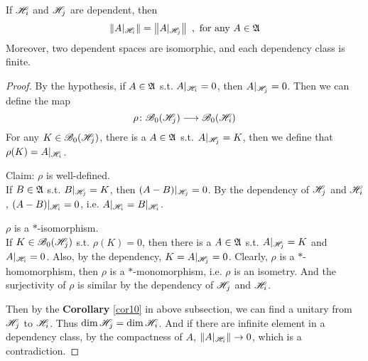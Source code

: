 \begin{prop}
	If $\mathscr{H}_i$ and $\mathscr{H}_j$ are dependent, then
	\begin{equation*}
		\left\lVert A|_{\mathscr{H}_i}\right\lVert = \left\lVert A|_{\mathscr{H}_j}\right\lVert~, \text{ for any } A \in \mathfrak{A}
	\end{equation*}
	Moreover, two dependent spaces are isomorphic, and each dependency class is finite.
\end{prop}
\begin{proof}
	By the hypothesis, if $A \in \mathfrak{A}$ s.t. $A|_{\mathscr{H}_i} = 0$, then $A|_{\mathscr{H}_j} = 0$. Then we can define the map
	\begin{equation*}
		\rho \colon  \mathscr{B}_0(\mathscr{H}_j)  \longrightarrow  \mathscr{B}_0(\mathscr{H}_i)
	\end{equation*}
	For any $K \in \mathscr{B}_0(\mathscr{H}_j)$, there is a $A \in \mathfrak{A}$ s.t. $A|_{\mathscr{H}_j} = K$, then we define that $\rho(K) = A|_{\mathscr{H}_i}$.
	\item Claim: $\rho$ is well-defined. \\
	If $B \in \mathfrak{A}$ s.t. $B|_{\mathscr{H}_j} = K$, then $(A-B)|_{\mathscr{H}_j} = 0$. By the dependency of $\mathscr{H}_j$ and $\mathscr{H}_i$, $(A-B)|_{\mathscr{H}_i} = 0$, i.e. $A|_{\mathscr{H}_i} = B|_{\mathscr{H}_i}$.
	\item $\rho$ is a $*$-isomorphism. \\
	If $K \in \mathscr{B}_0(\mathscr{H}_j)$ s.t. $\rho(K) = 0$, then there is a $A \in \mathfrak{A}$ s.t. $A|_{\mathscr{H}_j} = K$ and $A|_{\mathscr{H}_i} = 0$. Also, by the dependency, $K = A|_{\mathscr{H}_j} = 0$. Clearly, $\rho$ is a $*$-homomorphism, then $\rho$ is a $*$-monomorphism, i.e. $\rho$ is an isometry. And the surjectivity of $\rho$ is similar by the dependency of $\mathscr{H}_j$ and $\mathscr{H}_i$.
	\item Then by the \textbf{Corollary} \ref{cor10} in above subsection, we can find a unitary from $\mathscr{H}_j$ to $\mathscr{H}_i$. Thus $\dim{\mathscr{H}_j} = \dim{\mathscr{H}_i}$. And if there are infinite element in a dependency class, by the compactness of $A$, $\left\lVert A|_{\mathscr{H}_i}\right\lVert \rightarrow 0$, which is a contradiction.
\end{proof}

